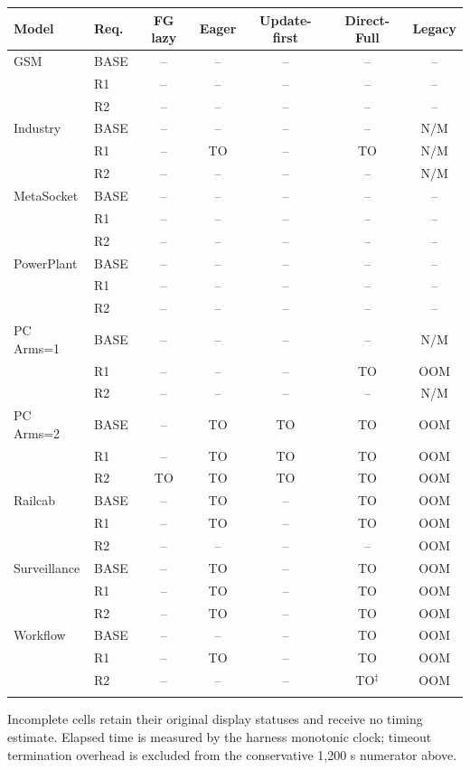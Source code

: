 \begin{tabular}{@{}llccccc@{}}
\toprule
Model & Req. & FG lazy & Eager & Update-first & Direct-Full & Legacy\\
\midrule
GSM & BASE & -- & -- & -- & -- & --\\
 & R1 & -- & -- & -- & -- & --\\
 & R2 & -- & -- & -- & -- & --\\
\addlinespace[2pt]
Industry & BASE & -- & -- & -- & -- & N/M\\
 & R1 & -- & TO & -- & TO & N/M\\
 & R2 & -- & -- & -- & -- & N/M\\
\addlinespace[2pt]
MetaSocket & BASE & -- & -- & -- & -- & --\\
 & R1 & -- & -- & -- & -- & --\\
 & R2 & -- & -- & -- & -- & --\\
\addlinespace[2pt]
PowerPlant & BASE & -- & -- & -- & -- & --\\
 & R1 & -- & -- & -- & -- & --\\
 & R2 & -- & -- & -- & -- & --\\
\addlinespace[2pt]
PC Arms=1 & BASE & -- & -- & -- & -- & N/M\\
 & R1 & -- & -- & -- & TO & OOM\\
 & R2 & -- & -- & -- & -- & N/M\\
\addlinespace[2pt]
PC Arms=2 & BASE & -- & TO & TO & TO & OOM\\
 & R1 & -- & TO & TO & TO & OOM\\
 & R2 & TO & TO & TO & TO & OOM\\
\addlinespace[2pt]
Railcab & BASE & -- & TO & -- & TO & OOM\\
 & R1 & -- & TO & -- & TO & OOM\\
 & R2 & -- & -- & -- & -- & OOM\\
\addlinespace[2pt]
Surveillance & BASE & -- & TO & -- & TO & OOM\\
 & R1 & -- & TO & -- & TO & OOM\\
 & R2 & -- & TO & -- & TO & OOM\\
\addlinespace[2pt]
Workflow & BASE & -- & -- & -- & TO & OOM\\
 & R1 & -- & TO & -- & TO & OOM\\
 & R2 & -- & -- & -- & TO$^{\ddagger}$ & OOM\\
\addlinespace[2pt]
\bottomrule
\end{tabular}\endgroup

Incomplete cells retain their original display statuses and receive no timing estimate. Elapsed time is measured by the harness monotonic clock; timeout termination overhead is excluded from the conservative 1,200 s numerator above.
